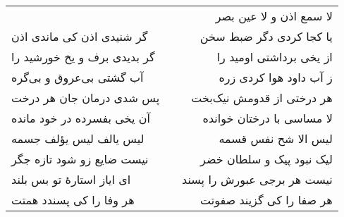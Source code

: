 \begin{center}
\begin{longtable}{l p{0.5cm} r}
&&
لا سمع اذن و لا عین بصر
\\
گر شنیدی اذن کی ماندی اذن
&&
یا کجا کردی دگر ضبط سخن
\\
گر بدیدی برف و یخ خورشید را
&&
از یخی برداشتی اومید را
\\
آب گشتی بی‌عروق و بی‌گره
&&
ز آب داود هوا کردی زره
\\
پس شدی درمان جان هر درخت
&&
هر درختی از قدومش نیک‌بخت
\\
آن یخی بفسرده در خود مانده
&&
لا مساسی با درختان خوانده
\\
لیس یالف لیس یؤلف جسمه
&&
لیس الا شح نفس قسمه
\\
نیست ضایع زو شود تازه جگر
&&
لیک نبود پیک و سلطان خضر
\\
ای ایاز استارهٔ تو بس بلند
&&
نیست هر برجی عبورش را پسند
\\
هر وفا را کی پسندد همتت
&&
هر صفا را کی گزیند صفوتت
\\
\end{longtable}
\end{center}
